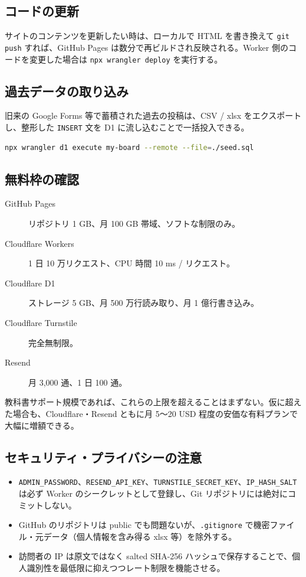 \documentclass[11pt,a4paper,uplatex,dvipdfmx]{jsarticle}
\begin{document}
\subsection{コードの更新}

サイトのコンテンツを更新したい時は、ローカルで HTML を書き換えて \texttt{git push} すれば、GitHub Pages は数分で再ビルドされ反映される。Worker 側のコードを変更した場合は \texttt{npx wrangler deploy} を実行する。

\subsection{過去データの取り込み}

旧来の Google Forms 等で蓄積された過去の投稿は、CSV / xlsx をエクスポートし、整形した \texttt{INSERT} 文を D1 に流し込むことで一括投入できる。

\begin{lstlisting}[language=bash]
npx wrangler d1 execute my-board --remote --file=./seed.sql
\end{lstlisting}

\subsection{無料枠の確認}

\begin{description}
\item[GitHub Pages] リポジトリ 1 GB、月 100 GB 帯域、ソフトな制限のみ。
\item[Cloudflare Workers] 1 日 10 万リクエスト、CPU 時間 10 ms / リクエスト。
\item[Cloudflare D1] ストレージ 5 GB、月 500 万行読み取り、月 1 億行書き込み。
\item[Cloudflare Turnstile] 完全無制限。
\item[Resend] 月 3{,}000 通、1 日 100 通。
\end{description}

教科書サポート規模であれば、これらの上限を超えることはまずない。仮に超えた場合も、Cloudflare・Resend ともに月 5～20 USD 程度の安価な有料プランで大幅に増額できる。

\subsection{セキュリティ・プライバシーの注意}

\begin{itemize}
\item \texttt{ADMIN\_PASSWORD}、\texttt{RESEND\_API\_KEY}、\texttt{TURNSTILE\_SECRET\_KEY}、\texttt{IP\_HASH\_SALT} は必ず Worker のシークレットとして登録し、Git リポジトリには絶対にコミットしない。
\item GitHub のリポジトリは public でも問題ないが、\texttt{.gitignore} で機密ファイル・元データ（個人情報を含み得る xlsx 等）を除外する。
\item 訪問者の IP は原文ではなく salted SHA-256 ハッシュで保存することで、個人識別性を最低限に抑えつつレート制限を機能させる。
\end{itemize}
\end{document}
